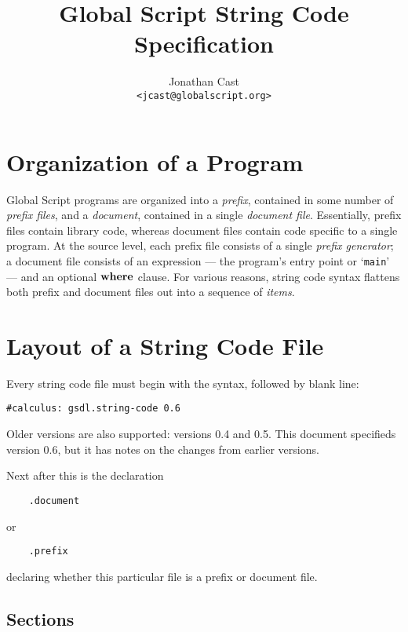 \documentclass{report}
\title{Global Script String Code Specification}
\author{Jonathan Cast\\\texttt{<jcast@globalscript.org>}}
\newcommand\ccode[1]{\texttt{#1}}
\begin{document}
\maketitle

\tableofcontents

\chapter{Organization of a Program}

Global Script programs are organized into a \emph{prefix},
contained in some number of \emph{prefix files},
 and a \emph{document}, contained in a single \emph{document file}.
Essentially, prefix files contain library code, whereas document files contain code specific to a single program.
At the source level, each prefix file consists of a single \emph{prefix generator};
a document file consists of an expression
--- the program's entry point or `\ccode{main}' ---
and an optional $\mathbf{where}$ clause.
For various reasons, string code syntax flattens both prefix and document files out into a sequence of \emph{items}.

\chapter{Layout of a String Code File}

Every string code file must begin with the syntax, followed by  blank line:
\begin{verbatim}
#calculus: gsdl.string-code 0.6
\end{verbatim}
Older versions are also supported: versions 0.4 and 0.5.
This document specifieds version 0.6, but it has notes on the changes from earlier versions.

Next after this is the declaration
\begin{verbatim}
	.document
\end{verbatim}
or
\begin{verbatim}
	.prefix
\end{verbatim}
declaring whether this particular file is a prefix or document file.

\section{Sections}
\end{document}
